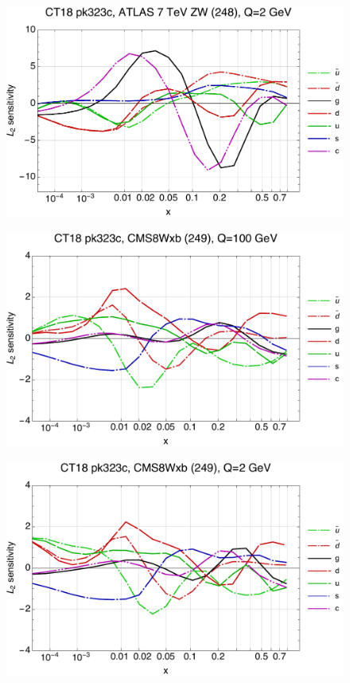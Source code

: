 \documentclass[10pt,aps,prd,floatfix,titlepage]{revtex4}
\begin{document}
\begin{figure}
\includegraphics[width=\textwidth,height=0.44\textheight,keepaspectratio]{1/248_ct18nn_L2_q2_Sf_1.pdf}
\caption{}
\end{figure}
\clearpage
\begin{figure}
\includegraphics[width=\textwidth,height=0.44\textheight,keepaspectratio]{1/249_ct18nn_L2_q100_Sf_1.pdf}
\caption{}
\end{figure}
\begin{figure}
\includegraphics[width=\textwidth,height=0.44\textheight,keepaspectratio]{1/249_ct18nn_L2_q2_Sf_1.pdf}
\caption{}
\end{figure}
\end{document}
